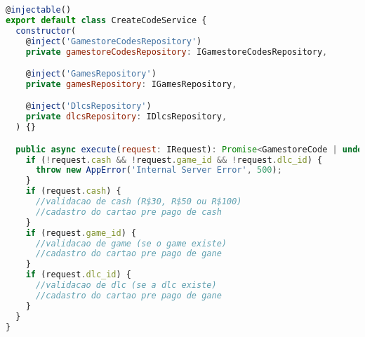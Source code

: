 \begin{lstlisting}[language=JavaScript, caption={Implementação que viola o OCP},captionpos=b, label=alg:ocpviolation]
@injectable()
export default class CreateCodeService {
  constructor(
    @inject('GamestoreCodesRepository')
    private gamestoreCodesRepository: IGamestoreCodesRepository,

    @inject('GamesRepository')
    private gamesRepository: IGamesRepository,

    @inject('DlcsRepository')
    private dlcsRepository: IDlcsRepository,
  ) {}

  public async execute(request: IRequest): Promise<GamestoreCode | undefined> {
    if (!request.cash && !request.game_id && !request.dlc_id) {
      throw new AppError('Internal Server Error', 500);
    }
    if (request.cash) {
      //validacao de cash (R$30, R$50 ou R$100)
      //cadastro do cartao pre pago de cash
    }
    if (request.game_id) {
      //validacao de game (se o game existe)
      //cadastro do cartao pre pago de gane
    }
    if (request.dlc_id) {
      //validacao de dlc (se a dlc existe)
      //cadastro do cartao pre pago de gane
    }
  }
}
\end{lstlisting}